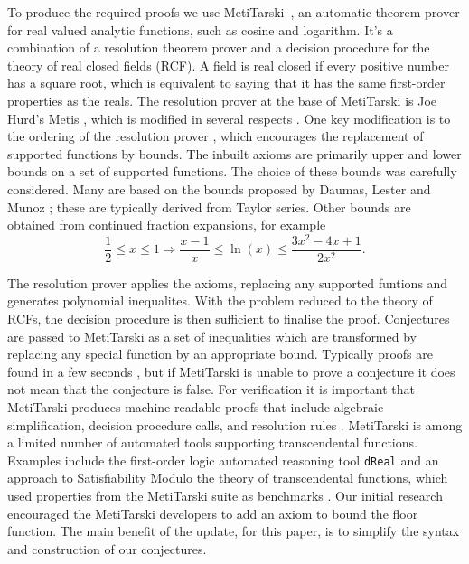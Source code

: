 \documentclass{fac}
\begin{document}
To produce the required proofs we use MetiTarski~\cite{akbarpour2010metitarski}, an automatic theorem prover for real valued analytic functions, such as cosine and logarithm. It's a combination of a resolution theorem prover and a decision procedure for the theory of real closed fields (RCF). A field is real closed if every positive number has a square root, which is equivalent to saying that it has the same first-order properties as the reals. The resolution prover at the base of MetiTarski is Joe Hurd's Metis \cite{metis_theorem_prover}, which is modified in several respects \cite{akbarpour2008metitarski}. One key modification is to the ordering of the resolution prover \cite{ludwig2007extension}, which encourages the replacement of supported functions by bounds. The inbuilt axioms are primarily upper and lower bounds on a set of supported functions. The choice of these bounds was carefully considered. Many are based on the bounds proposed by Daumas, Lester and Munoz \cite{daumas2008verified}; these are typically derived from Taylor series. Other bounds are obtained from continued fraction expansions, for example
\[\frac{1}{2} \leq x \leq 1 \Rightarrow \frac{x-1}{x} \leq \ln(x) \leq \frac{3x^2-4x+1}{2x^2}.\]

The resolution prover applies the axioms, replacing any supported funtions and generates polynomial inequalites. With the problem reduced to the theory of RCFs, the decision procedure is then sufficient to finalise the proof. Conjectures are passed to MetiTarski as a set of inequalities which are transformed by replacing any special function by an appropriate bound. Typically proofs are found in a few seconds \cite{akbarpour2009applications}, but if MetiTarski is unable to prove a conjecture it does not mean that the conjecture is false. For verification it is important that MetiTarski produces machine readable proofs that include algebraic simplification, decision procedure calls, and resolution rules \cite{denman2009formal}. MetiTarski is among a limited number of automated tools supporting transcendental functions. Examples include the first-order logic automated reasoning tool \texttt{dReal} \cite{gao2013dreal} and an approach to Satisfiability Modulo the theory of transcendental functions, which used properties from the MetiTarski suite as benchmarks \cite{cimatti2017satisfiability}. Our initial research encouraged the MetiTarski developers to add an axiom to bound the floor function. The main benefit of the update, for this paper, is to simplify the syntax and construction of our conjectures.  
\end{document}

